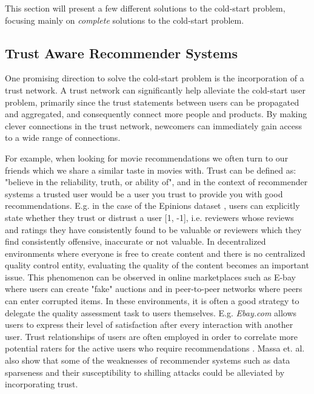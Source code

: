 
This section will present a few different solutions to the cold-start problem, focusing mainly on \emph{complete} solutions to the cold-start problem.

\subsection{Trust Aware Recommender Systems}

One promising direction to solve the cold-start problem is the incorporation of
a trust network. A trust network can significantly help alleviate the
cold-start user problem, primarily since the trust statements between users can
be propagated and aggregated, and consequently connect more people and
products. By making clever connections in the trust network, newcomers can
immediately gain access to a wide range of connections.


For example, when looking for movie recommendations we often turn to our friends which we share a similar taste in movies with. Trust can be defined as: "believe in the reliability, truth, or ability of", and in the context of recommender systems a trusted user would be a user you trust to provide you with good recommendations. E.g. in the case of the Epinions dataset \cite{Epinions}, users can explicitly state whether they trust or distrust a user [1, -1], i.e. reviewers whose reviews and ratings they have consistently found to be valuable or reviewers which they find consistently offensive, inaccurate or not valuable. In decentralized environments where everyone is free to create content and there
is no centralized quality control entity, evaluating the quality of the content becomes an important issue. This phenomenon can be observed in online
marketplaces such as E-bay where users can create "fake" auctions and in peer-to-peer networks where peers can enter corrupted items. In these environments, it is often a good strategy to delegate the quality assessment task to users themselves. E.g. \emph{Ebay.com} allows users to express their level of satisfaction after every interaction with another user. Trust relationships of users are often employed in order to correlate more potential raters for the active users who require recommendations \cite{Massa2004, Massa2007}. Massa et. al. \cite{Massa2004} also show that some of the weaknesses of recommender systems such as data sparseness and their susceptibility to shilling attacks could be alleviated by incorporating trust.

